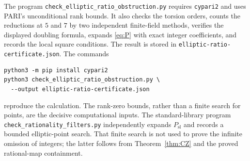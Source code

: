 \documentclass[11pt,a4paper]{article}
\theoremstyle{definition}
\begin{document}
The program \nolinkurl{check_elliptic_ratio_obstruction.py} requires
\texttt{cypari2} and uses PARI's unconditional rank bounds. It also
checks the torsion orders, counts the reductions at $5$ and $7$
by two independent finite-field methods, verifies the displayed
doubling formula, expands \eqref{eq:P} with exact integer
coefficients, and records the local square conditions.
The result is stored in
\nolinkurl{elliptic-ratio-certificate.json}.
The commands
\begin{verbatim}
python3 -m pip install cypari2
python3 check_elliptic_ratio_obstruction.py \
  --output elliptic-ratio-certificate.json
\end{verbatim}
reproduce the calculation. The rank-zero bounds, rather than a
finite search for points, are the decisive computational inputs.
The standard-library program \nolinkurl{check_rationality_filters.py}
independently expands $P_{\mathrm{sl}}$ and records a bounded
elliptic-point search. That finite search is not used to prove the
infinite omission of integers; the latter follows from
Theorem~\ref{thm:CZ} and the proved rational-map containment.
\end{document}

